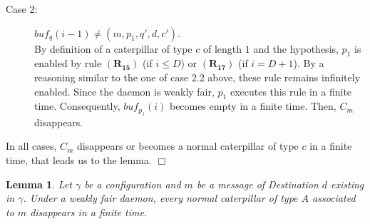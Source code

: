 \documentclass[11pt]{article}
\newtheorem{lemma}{Lemma}
\newenvironment{proof}{{\noindent\bf Proof. } }{{\hfill $\Box$}}
\begin{document}
\begin{proof}
\begin{enumerate}
\begin{description}
\item [Case 2:] $buf_{q}(i-1)\neq(m,p_{1},q',d,c')$.\\
By definition of a caterpillar of type $c$ of length $1$ and the hypothesis, $p_{1}$ is enabled by rule $\boldsymbol{(R_{15})}$ (if $i\leq D$) or $\boldsymbol{(R_{17})}$ (if $i=D+1$). By a reasoning similar to the one of case 2.2 above, these rule remains infinitely enabled. Since the daemon is weakly fair, $p_{1}$ executes this rule in a finite time. Consequently, $buf_{p_{1}}(i)$ becomes empty in a finite time. Then, $C_{m}$ disappears.
\end{description}

\end{enumerate}

In all cases, $C_{m}$ disappears or becomes a normal caterpillar of type $c$ in a finite time, that leads us to the lemma.
\end{proof}

\begin{lemma} \label{lem:prelem2}
Let $\gamma$ be a configuration and $m$ be a message of Destination $d$ existing in $\gamma$. Under a weakly fair daemon, every normal caterpillar of type $A$ associated to $m$ disappears in a finite time.
\end{lemma}
\end{document}
